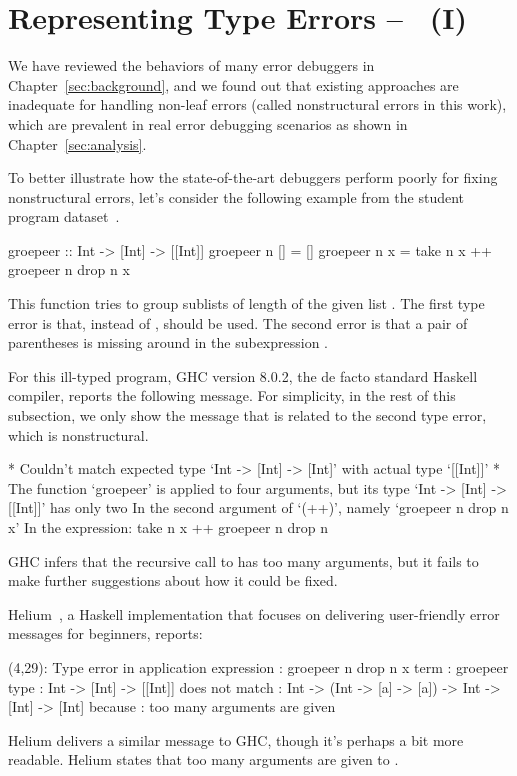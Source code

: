 \documentclass[12pt]{report}	%
\begin{document}
\chapter{Representing Type Errors -- \newCompiler\ (I)}
\label{sec:features}

We have reviewed the behaviors of many error debuggers in Chapter~\ref{sec:background},
and we found out that existing approaches are inadequate for handling non-leaf errors (called nonstructural errors in this work), 
which are prevalent in real error debugging scenarios as shown in Chapter~\ref{sec:analysis}.

To better illustrate how the state-of-the-art debuggers perform poorly for fixing nonstructural errors, 
let's consider the following example from the student program dataset~\cite{Hage09:Neon}.
%
\begin{program}
groepeer :: Int -> [Int] -> [[Int]]
groepeer n [] = []
groepeer n x  = take n x ++ groepeer n drop n x
\end{program}
%
This function
tries to group sublists of length  of the given list .
The first type error is that, instead of \prog{++}, \prog{:}
should be used. The second
error is that 
a pair of parentheses
is missing around 
in the subexpression
.

For this ill-typed program, GHC version 8.0.2,
the de facto standard Haskell compiler,
reports the following message.
For simplicity, in the rest of this subsection,
we only show the message 
that is related to the second type error, which is nonstructural.
%
\begin{program}
* Couldn't match expected type `Int -> [Int] -> [Int]'
    with actual type `[[Int]]'
* The function `groepeer' is applied to four arguments,
    but its type `Int -> [Int] -> [[Int]]' has only two
    In the second argument of `(++)', namely `groepeer n drop n x'
    In the expression: take n x ++ groepeer n drop n
\end{program}
%
GHC infers that the recursive call to  has too many arguments,
but it fails to make further suggestions about how it could be fixed.

Helium~\cite{Heeren03:HLH}, a Haskell implementation that
focuses on delivering user-friendly error messages for
beginners, reports:
%
\begin{program}
(4,29): Type error in application
 expression       : groepeer n drop n x
 term             : groepeer
   type           : Int -> [Int]               -> [[Int]]
   does not match : Int -> (Int -> [a] -> [a]) -> Int -> [Int] -> [Int]
 because          : too many arguments are given
\end{program}
%
Helium delivers a similar message to GHC, though it's perhaps a bit more readable.
Helium states that too many arguments
are given to . 
\end{document}
